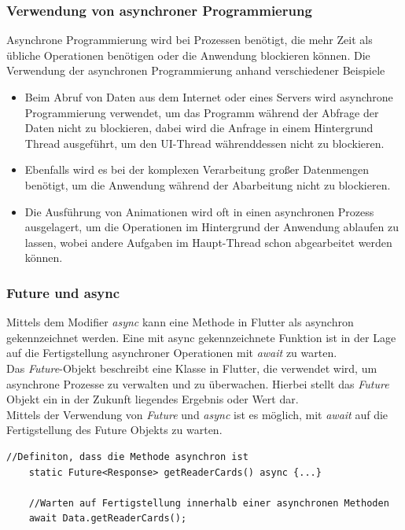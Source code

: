 \subsubsection{Verwendung von asynchroner Programmierung}
Asynchrone Programmierung wird bei Prozessen benötigt, die mehr Zeit als übliche Operationen benötigen oder die Anwendung blockieren können. 
Die Verwendung der asynchronen Programmierung anhand verschiedener Beispiele
\begin{itemize}
    \item Beim Abruf von Daten aus dem Internet oder eines Servers wird asynchrone Programmierung verwendet, um das Programm während der Abfrage der Daten nicht zu blockieren, dabei wird die Anfrage in einem Hintergrund Thread ausgeführt, um den UI-Thread währenddessen nicht zu blockieren.
    
    \item Ebenfalls wird es bei der komplexen Verarbeitung großer Datenmengen benötigt, um die Anwendung während der Abarbeitung nicht zu blockieren.
    
    \item Die Ausführung von Animationen wird oft in einen asynchronen Prozess ausgelagert, um die Operationen im Hintergrund der Anwendung ablaufen zu lassen, wobei andere Aufgaben im Haupt-Thread schon abgearbeitet werden können.
\end{itemize}

\subsubsection{Future und async}\label{subsec:thero:async}
Mittels dem Modifier {\textit{async}} kann eine Methode in Flutter als asynchron gekennzeichnet werden. Eine mit {\textit{}{async}} gekennzeichnete Funktion ist in der Lage auf die Fertigstellung asynchroner Operationen mit {\textit{await}} zu warten. 
\\
Das {\textit{Future}}-Objekt beschreibt eine Klasse in Flutter, die verwendet wird, um asynchrone Prozesse zu verwalten und zu überwachen. Hierbei stellt das {\textit{Future}} Objekt ein in der Zukunft liegendes Ergebnis oder Wert dar. 
\\
Mittels der Verwendung von {\textit{Future}} und {\textit{async}} ist es möglich, mit {\textit{await}} auf die Fertigstellung des Future Objekts zu warten.

\begin{lstlisting}[caption=Asynchrone Methode zum Abfragen von Daten über einer API,style=flutterListingStyle]
    //Definiton, dass die Methode asynchron ist
    static Future<Response> getReaderCards() async {...}

    //Warten auf Fertigstellung innerhalb einer asynchronen Methoden
    await Data.getReaderCards();
\end{lstlisting}

